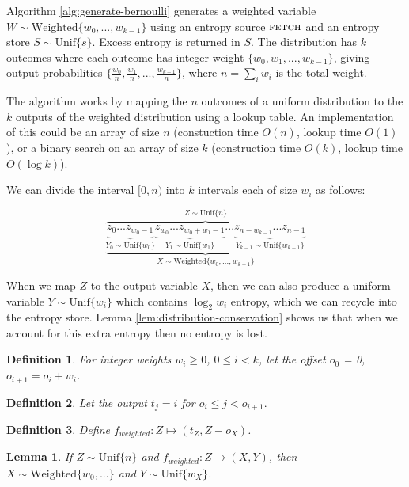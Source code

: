 \documentclass[lettersize,onecolumn]{IEEEtran}
\newtheorem{lemma}{Lemma}
\newtheorem{definition}{Definition}
\newcommand{\unif}[1]{\mathrm{Unif}\{#1\}}
\begin{document}
Algorithm \ref{alg:generate-bernoulli} generates a weighted variable $W \sim \mathrm{Weighted}\{w_0, ..., w_{k-1}\}$ using an entropy source $\textsc{fetch}$ and an entropy store $S \sim \unif{s}$. Excess entropy is returned in $S$. The distribution has $k$ outcomes where each outcome has integer weight $\{w_0, w_1, ..., w_{k-1}\}$, giving output probabilities $\{\frac{w_0}{n}, \frac{w_1}{n}, ..., \frac{w_{k-1}}{n}\}$, where $n=\sum_i w_i$ is the total weight.

The algorithm works by mapping the $n$ outcomes of a uniform distribution to the $k$ outputs of the weighted distribution using a lookup table. An implementation of this could be an array of size $n$ (constuction time $O(n)$, lookup time $O(1)$), or a binary search on an array of size $k$ (construction time $O(k)$, lookup time $O(\log k)$).

We can divide the interval $[0,n)$ into $k$ intervals each of size $w_i$ as follows:

\[
\overbrace{
    \underbrace{
        \underbrace{z_0 ... z_{w_0-1}}_{Y_0 \sim \unif{w_0}}
          \underbrace{z_{w_0} ... z_{w_0+w_1-1}}_{Y_1 \sim \unif{w_1}}
          ...
          \underbrace{
             z_{n-w_{k-1}} ... 
             z_{n-1}
         }_{Y_{k-1} \sim \unif{w_{k-1}}}
    }_{X \sim \mathrm{Weighted}\{w_0, ..., w_{k-1}\}}
}^{Z \sim \unif{n}}
\]

When we map $Z$ to the output variable $X$, then we can also produce a uniform variable $Y \sim \unif{w_i}$ which contains $\log_2w_i$ entropy, which we can recycle into the entropy store. Lemma \ref{lem:distribution-conservation} shows us that when we account for this extra entropy then no entropy is lost.

\begin{definition}
    \label{def:o}
    For integer weights $w_i \ge 0$, $0 \le i < k$, let the offset $o_0$ = 0, $o_{i+1} = o_i + w_i$.
\end{definition}

\begin{definition}
    \label{def:t}
    Let the output $t_j = i$ for $o_i \le j < o_{i+1}.$
\end{definition}

\begin{definition}
    Define $f_{weighted}: Z \mapsto (t_Z, Z-o_X)$.
\end{definition}

\begin{lemma}
    If $Z \sim \unif{n}$ and $f_{weighted}: Z \rightarrow (X, Y)$, then $X \sim \mathrm{Weighted}\{w_0, ...\}$ and $Y \sim \unif{w_X}$.
\end{lemma}
\end{document}
